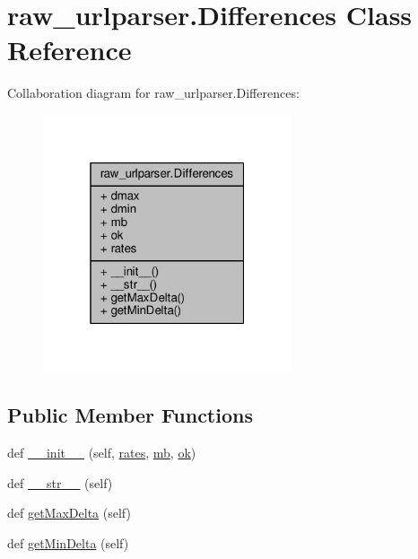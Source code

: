 \hypertarget{classraw__urlparser_1_1_differences}{}\section{raw\+\_\+urlparser.\+Differences Class Reference}
\label{classraw__urlparser_1_1_differences}


Collaboration diagram for raw\+\_\+urlparser.\+Differences\+:\nopagebreak
\begin{figure}[H]
\begin{center}
\leavevmode
\includegraphics[width=208pt]{classraw__urlparser_1_1_differences__coll__graph}
\end{center}
\end{figure}
\subsection*{Public Member Functions}
\begin{DoxyCompactItemize}
\item 
def \hyperlink{classraw__urlparser_1_1_differences_ab96f235ba2697e17fea2e3dc83ab2ca0}{\+\_\+\+\_\+init\+\_\+\+\_\+} (self, \hyperlink{classraw__urlparser_1_1_differences_ad4e7eadb659a1cdcba90793cc52af174}{rates}, \hyperlink{classraw__urlparser_1_1_differences_ab4c3073b8c569b7791ab3b8e21e9b364}{mb}, \hyperlink{classraw__urlparser_1_1_differences_a46fe97bedb977585a0b27d7408ace118}{ok})
\item 
def \hyperlink{classraw__urlparser_1_1_differences_ae30a248dbbe9fde42b0bcbd81160f070}{\+\_\+\+\_\+str\+\_\+\+\_\+} (self)
\item 
def \hyperlink{classraw__urlparser_1_1_differences_acfa09d743c08cc813a5bc435aa6875da}{get\+Max\+Delta} (self)
\item 
def \hyperlink{classraw__urlparser_1_1_differences_af19faaea85ca8ac0d327c8443ddd99ef}{get\+Min\+Delta} (self)
\end{DoxyCompactItemize}

